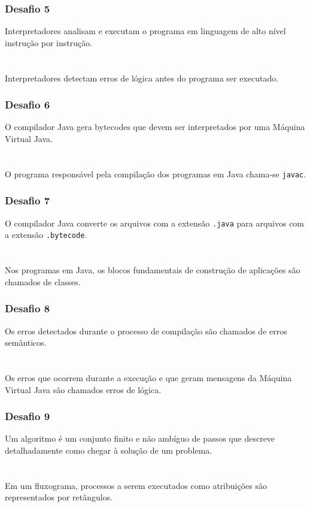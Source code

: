 \documentclass[aspectratio=169]{beamer}
\begin{document}
\begin{frame}\frametitle{Desafio 5}
Interpretadores analisam e executam o programa em linguagem de alto nível instrução por instrução.\\
~\\
~\\
Interpretadores detectam erros de lógica antes do programa ser executado.
\end{frame}

\begin{frame}\frametitle{Desafio 6}
O compilador Java gera bytecodes que devem ser interpretados por uma Máquina Virtual Java.\\
~\\
~\\
O programa responsável pela compilação dos programas em Java chama-se \texttt{javac}.
\end{frame}

\begin{frame}\frametitle{Desafio 7}
O compilador Java converte os arquivos com a extensão \texttt{.java} para arquivos com a extensão \texttt{.bytecode}.\\
~\\
~\\
Nos programas em Java, os blocos fundamentais de construção de aplicações são chamados de classes.
\end{frame}

\begin{frame}\frametitle{Desafio 8}
Os erros detectados durante o processo de compilação são chamados de erros semânticos.\\
~\\
~\\
Os erros que ocorrem durante a execução e que geram mensagens da Máquina Virtual Java são chamados erros de lógica.
\end{frame}

\begin{frame}\frametitle{Desafio 9}
Um algoritmo é um conjunto finito e não ambíguo de passos que descreve detalhadamente como chegar à solução de um problema.\\
~\\
~\\
Em um fluxograma, processos a serem executados como atribuições são representados por retângulos.
\end{frame}
\end{document}
